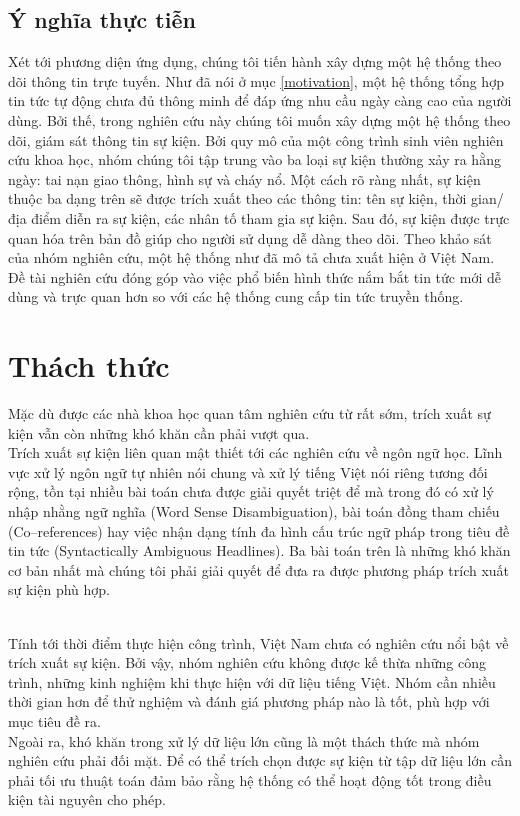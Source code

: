 \subsection{Ý nghĩa thực tiễn}

\noindent Xét tới  phương diện  ứng dụng, chúng tôi tiến hành xây dựng một hệ thống theo dõi thông tin trực tuyến. Như đã nói ở mục \ref{motivation}, một hệ thống tổng hợp tin tức tự động chưa đủ thông minh để đáp ứng nhu cầu ngày càng cao của người dùng. Bởi thế, trong nghiên cứu này chúng tôi muốn xây dựng một hệ thống theo dõi, giám sát thông tin sự kiện. Bởi quy mô của một công trình sinh viên nghiên cứu khoa học, nhóm chúng tôi tập trung vào ba loại sự kiện thường xảy ra hằng ngày: tai nạn giao thông, hình sự và cháy nổ. Một cách rõ ràng nhất, sự kiện thuộc ba dạng trên sẽ được trích xuất theo các thông tin: tên sự kiện, thời gian/địa điểm diễn ra sự kiện, các nhân tố tham gia sự kiện. Sau đó, sự kiện được trực quan hóa trên  bản đồ giúp cho người sử dụng dễ dàng theo dõi. Theo khảo sát của nhóm nghiên cứu, một hệ thống như đã mô tả chưa xuất hiện ở Việt Nam. Đề tài nghiên cứu đóng góp vào việc phổ biến hình thức nắm bắt tin tức mới dễ dùng và trực quan hơn so với các hệ thống cung cấp tin tức truyền thống.


 \section{Thách thức}
   \noindent  Mặc dù được các nhà khoa học quan tâm nghiên cứu  từ rất sớm, trích xuất sự kiện vẫn còn những khó khăn cần phải vượt qua. \\
\noindent Trích xuất sự kiện liên quan mật thiết tới các nghiên cứu về ngôn ngữ học. Lĩnh vực xử lý ngôn ngữ tự nhiên nói chung và xử lý tiếng Việt nói riêng tương đối rộng, tồn tại nhiều bài toán chưa được giải quyết triệt để mà trong đó có  xử lý nhập nhằng ngữ nghĩa (Word Sense Disambiguation), bài toán đồng tham chiếu (Co--references) hay việc nhận dạng tính đa hình cấu trúc ngữ pháp trong tiêu đề tin tức (Syntactically  Ambiguous Headlines). Ba bài toán trên là những khó khăn cơ bản nhất mà chúng tôi phải giải quyết để đưa ra được phương pháp trích xuất sự kiện phù hợp.

\\
\noindent Tính tới thời điểm thực hiện công trình, Việt Nam chưa có nghiên cứu nổi bật về trích xuất sự kiện. Bởi vậy, nhóm nghiên cứu không được kế thừa những công trình, những kinh nghiệm khi thực hiện với dữ liệu tiếng Việt. Nhóm cần nhiều thời gian hơn để thử nghiệm và đánh giá phương pháp nào là tốt, phù hợp với mục tiêu đề ra.
\\
\noindent Ngoài ra, khó khăn trong xử lý dữ liệu lớn cũng là một thách thức mà nhóm nghiên cứu phải đối mặt. Để có thể trích chọn được sự kiện từ tập dữ liệu lớn cần phải tối ưu thuật toán đảm bảo rằng hệ thống có thể hoạt động tốt trong điều kiện tài nguyên cho phép.


